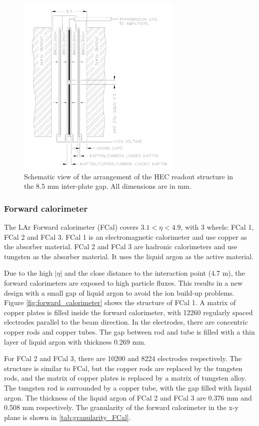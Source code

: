 \begin{figure}
\centering
\includegraphics[width=0.7\textwidth]{data/photo/detector/HEC.png}
\caption{Schematic view of the arrangement of the HEC readout structure in the 8.5 mm inter-plate gap. All dimensions are in mm. \cite{ATLAS_doc}}
\label{fig:HEC}
\end{figure}

\subsubsection{Forward calorimeter}
The LAr Forward calorimeter (FCal) covers $3.1<\eta<4.9$, with 3 wheels: FCal 1, FCal 2 and FCal 3.
FCal 1 is an electromagnetic calorimeter and use copper as the absorber material.
FCal 2 and FCal 3 are hadronic calorimeters and use tungsten as the absorber material.
It uses the liquid argon as the active material.

Due to the high $|\eta|$ and the close distance to the interaction point (4.7 m), the forward calorimeters are exposed to high particle fluxes.
This results in a new design with a small gap of liquid argon to avoid the ion build-up problems.
Figure \ref{fig:forward_calorimeter} shows the structure of FCal 1.
A matrix of copper plates is filled inside the forward calorimeter, with 12260 regularly spaced electrodes parallel to the beam direction.
In the electrodes, there are concentric copper rods and copper tubes.
The gap between rod and tube is filled with a thin layer of liquid argon with thickness 0.269 mm.

For FCal 2 and FCal 3, there are 10200 and 8224 electrodes respectively.
The structure is similar to FCal, but the copper rods are replaced by the tungsten rods, and the matrix of copper plates is replaced by a matrix of tungsten alloy.
The tungsten rod is surrounded by a copper tube, with the gap filled with liquid argon.
The thickness of the liquid argon of FCal 2 and FCal 3 are 0.376 mm and 0.508 mm respectively.
The granularity of the forward calorimeter in the x-y plane is shown in \ref{tab:granularity_FCal}.

